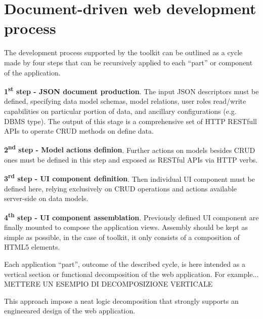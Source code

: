 \section{Document-driven web development process}\label{sec:dev-proc}

The development process supported by the toolkit can be outlined as a cycle made by four steps that can be recursively applied to each ``part'' or component of the application. 

{\bf 1\textsuperscript{st} step - JSON document production}. The input JSON descriptors must be defined, specifying data model schemas, model relations, user roles read/write capabilities on particular portion of data, and ancillary configurations (e.g. DBMS type). The output of this stage is a comprehensive set of HTTP RESTfull APIs to operate CRUD methods on define data.

{\bf 2\textsuperscript{nd} step - Model actions definion}. Further actions on models besides CRUD ones must be defined in this step and exposed as RESTful APIs via HTTP verbs.

{\bf 3\textsuperscript{rd} step - UI component definition}. Then individual UI component must be defined here, relying exclusively on CRUD operations and actions available server-side on data models.

{\bf 4\textsuperscript{th} step - UI component assemblation}. Previously defined UI component are finally mounted to compose the application views. Assembly should be kept as simple as possible, in the case of  toolkit, it only consists of a composition of HTML5 elements.




Each application ``part'', outcome of the described cycle, is here intended as a vertical section or functional decomposition of the web application. 
For example... METTERE UN ESEMPIO DI DECOMPOSIZIONE VERTICALE

This approach impose a neat logic decomposition that strongly supports an engineeared design of the web application.
